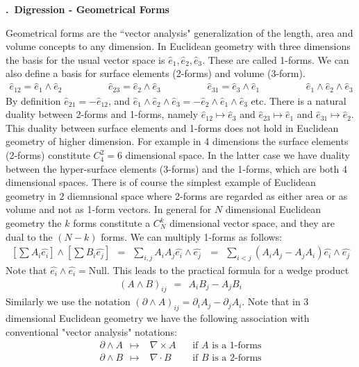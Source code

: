 \documentclass[onecolumn,fleqn, 11pt]{revtex4}
\newcommand{\beq}{\begin{eqnarray}}
\newcommand{\eeq}{\end{eqnarray}}
\renewcommand{\thesubsection}{\arabic{subsection}}
\renewcommand{\thesubsubsection}{\arabic{subsubsection}}
\newcommand{\sheadC}[1]
{
\addtocounter{subsubsection}{1}
\vspace{5mm}
{\bf \thesubsection.\thesubsubsection \ #1}  
\nopagebreak
\phantomsection
}
\begin{document}
\sheadC{Digression - Geometrical Forms}

    
Geometrical forms are the ``vector analysis"  
generalization of the length, area and volume concepts 
to any dimension. 
In Euclidean geometry with three dimensions 
the basis for the usual vector space 
is $\hat{e}_1,\hat{e}_2,\hat{e}_3$. 
These are called 1-forms. We can also define 
a basis for surface elements (2-forms) and volume (3-form).
\beq
\hat{e}_{12} = \hat{e}_1\wedge\hat{e}_2 
\hspace{2cm}
\hat{e}_{23} = \hat{e}_2\wedge\hat{e}_3 
\hspace{2cm}
\hat{e}_{31} = \hat{e}_3\wedge\hat{e}_1
\hspace{2cm}
\hat{e}_1\wedge\hat{e}_2\wedge\hat{e}_3
\eeq
By definition $\hat{e}_{21} = -\hat{e}_{12}$, and $\hat{e}_1\wedge\hat{e}_2\wedge\hat{e}_3=-\hat{e}_2\wedge\hat{e}_1\wedge\hat{e}_3$ etc. 
There is a natural duality between 2-forms and 1-forms, 
namely $\hat{e}_{12} \mapsto \hat{e}_3$ 
and  $\hat{e}_{23} \mapsto \hat{e}_1$ 
and $\hat{e}_{31} \mapsto \hat{e}_2$. 
This duality between surface elements and 1-forms does not hold in Euclidean geometry of higher dimension. 
For example in 4 dimensions the surface elements (2-forms) constitute $C^2_4=6$ dimensional space. 
In the latter case we have duality between the hyper-surface elements (3-forms) and the 1-forms, which are both 4 dimensional spaces.   
There is of course the simplest example of Euclidean geometry in 2 diemnsional space 
where 2-forms are regarded as either area or as volume and not as 1-form vectors.  
In general for $N$ dimensional Euclidean geometry the $k$ forms constitute a $C^k_N$ 
dimensional vector space, and they are dual to the $(N-k)$ forms. 
We can multiply 1-forms as follows:
\beq
\left[\sum A_i \hat{e_i} \right] \wedge \left[ \sum B_i\hat{e_j} \right]
\ \ = \ \ \sum_{i,j} A_i A_j \hat{e_i}\wedge\hat{e_j}\
\ \ = \ \ \sum_{i<j} (A_i A_j-A_j A_i)\hat{e_i}\wedge\hat{e_j}
\eeq
Note that $\hat{e_i}\wedge\hat{e_i}=\mbox{Null}$. 
This leads to the practical formula for a wedge product  
\beq
(A\wedge B)_{ij} \ \ = \ \ A_i B_j-A_j B_i
\eeq
Similarly we use the notation $(\partial \wedge A)_{ij}=\partial_i A_j - \partial_j A_i$. 
Note that in 3 dimensional Euclidean geometry we have the following association 
with conventional "vector analysis" notations:  
\beq
\partial \wedge A \ \ \mapsto & \nabla \times A  \ \ \ \ & \mbox{if $A$ is a 1-forms}
\\ \nonumber
\partial \wedge B \ \ \mapsto & \nabla \cdot B \ \ \ \ \ & \mbox{if $B$ is a 2-forms}
\eeq
\end{document}
